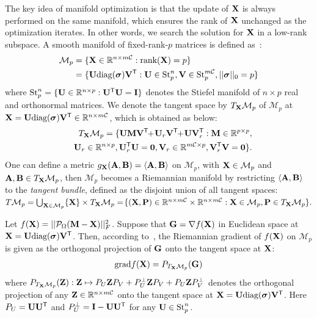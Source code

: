 \documentclass[10pt,twocolumn,letterpaper]{article}
\def\ranksym{p}
\def\symp{r}
\def\calP{\mathcal{P}}
\def\M{\mathcal{M}}
\def\R{{\mathbb R}}
\def\U{{\bf U}}
\def\V{{\bf V}}
\def\diag{\mbox{diag}}
\def\bsigma{\mbox{{\boldmath $\sigma$}}}
\def\trsp{{\sf T}}
\def\I{{\bf I}}
\def\0{{\bf 0}}
\def\G{{\bf G}}
\def\grad{{\text{grad}}}
\def\bZ{{\bf Z}}
\def\bB{{\bf B}}
\def\bM{{\bf M}}
\def\calC{{\mathcal{C}}}
\def\bX{{\bf X}}
\def\bA{{\bf A}}
\def\bX{{\bf X}}
\def\bP{{\bf P}}
\def\rank{{\text{rank}}}
\begin{document}
The key idea of manifold optimization is that the update of $\bX$ is always performed on the same manifold, which ensures the rank of $\bX$ unchanged as the optimization iterates.
In other words, we search the solution for $\bX$ in a low-rank subspace.
A smooth manifold of fixed-rank-$\ranksym$ matrices is defined as~\cite{vandereycken2013lowrank}:
{
\begin{align}
\M_{\ranksym} &= \{\bX\in \R^{n\times m\calC}: \rank(\bX) = \ranksym\} \nonumber \\
       &= \{\U\diag(\bsigma)\V^{\trsp}: \U \in \textrm{St}_{\ranksym}^{n}, \V \in
           \textrm{St}_{\ranksym}^{m\calC}, ||\bsigma||_0 = \ranksym\} \nonumber
\end{align}
}
\noindent
where $\textrm{St}_{\ranksym}^{n} = \{\U \in \R^{n\times \ranksym}:
\U^{\trsp}\U = \I \}$ denotes the Stiefel manifold of $n \times \ranksym$ real and orthonormal matrices.
We denote the tangent space by $T_{\bX}\M_{\ranksym}$ of $\M_{\ranksym}$ at $\bX = \U\diag(\bsigma)\V^{\trsp} \in \R^{n \times m\calC}$,
which is obtained as below:
{
\begin{align}
\label{eq:tangent_vector}
&&T_{\bX}\M_{\ranksym} =  \{\U\bM\V^{\trsp} \!\!+\! \U_{\symp} \V^{\trsp} \!\!+\!
\U\V_{\symp}^{\trsp}: \bM \in \R^{\ranksym \times \ranksym}, \nonumber\\ && \U_{\symp} \in \R^{n\times \ranksym},
\U_{\symp}^{\trsp}\U = \0, \V_{\symp} \in \R^{m\calC \times \ranksym}, \V_{\symp}^{\trsp}\V = \0\}.
\end{align}
}
\noindent
One can define a metric $g_{\bX}({\bA},{\bB}) = \langle{\bA},{\bB}\rangle$ on $\M_{\ranksym}$,
with $\bX \in \M_{\ranksym}$ and ${\bA},{\bB} \in T_{\bX}\M_{\ranksym}$,
then $\M_{\ranksym}$ becomes a Riemannian manifold by restricting
$\langle\bA,\bB\rangle$
to the \emph{tangent bundle}, defined as the disjoint union of all tangent spaces:
$T\M_{\ranksym} = \bigcup_{\bX\in \M_{\ranksym}}\{\bX\} \times T_{\bX}\M_{\ranksym}
         = \! \{(\bX,\bP)\in \R^{n \times m\calC} \times \R^{n \times m\calC}: \bX \in \M_{\ranksym}, \bP \in T_{\bX}\M_{\ranksym}\}.$


Let $f(\bX) = ||\calP_{\Omega} (\bM - \bX) ||_F^2$.
Suppose that $\G = \nabla f(\bX)$ in Euclidean space at $\bX = \U\diag(\bsigma)\V^{\trsp}$.
Then, according to~\cite{vandereycken2013lowrank}, the Riemannian gradient of $f(\bX)$ on $\M_\ranksym$ is given as the orthogonal
projection of $\G$ onto the tangent space at $\bX$:
{
\begin{eqnarray}\label{eq:grad}
\grad{f(\bX)} = P_{T_{\bX}\M_{\ranksym}}(\G)
\end{eqnarray}
}
\noindent
where
$P_{T_{\bX}\M_{\ranksym}}(\bZ): \bZ \mapsto P_{U}\bZ P_{V} + P_{U}^{\perp} \bZ P_{V} + P_{U} \bZ P_{V}^{\perp}$
denotes the orthogonal projection of any
$\bZ \in \R^{n \times m\calC}$ onto the tangent space at $\bX = \U\diag(\bsigma)\V^{\trsp}$.
Here $P_U = \U \U^{\trsp}$ and $P_U^{\perp} = \I - \U \U^{\trsp}$ for any $\U \in \textrm{St}_{\ranksym}^{n}$.
\end{document}
